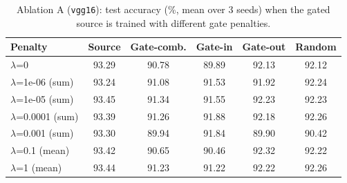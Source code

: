 \begin{table}[t]
\centering
\caption{Ablation A (\texttt{vgg16}): test accuracy (\%, mean over 3 seeds) when the gated source is trained with different gate penalties.}
\label{tab:ablation_a_vgg16}
\footnotesize
\setlength{\tabcolsep}{2.5pt}
\begin{tabular}{lccccc}
\toprule
Penalty & Source & Gate-comb. & Gate-in & Gate-out & Random \\
\midrule
$\lambda$=0 & 93.29 & 90.78 & 89.89 & 92.13 & 92.12 \\
$\lambda$=1e-06 (sum) & 93.24 & 91.08 & 91.53 & 91.92 & 92.24 \\
$\lambda$=1e-05 (sum) & 93.45 & 91.34 & 91.55 & 92.23 & 92.23 \\
$\lambda$=0.0001 (sum) & 93.39 & 91.26 & 91.88 & 92.18 & 92.26 \\
$\lambda$=0.001 (sum) & 93.30 & 89.94 & 91.84 & 89.90 & 90.42 \\
$\lambda$=0.1 (mean) & 93.42 & 90.65 & 90.46 & 92.32 & 92.22 \\
$\lambda$=1 (mean) & 93.44 & 91.23 & 91.22 & 92.22 & 92.26 \\
\bottomrule
\end{tabular}
\end{table}
